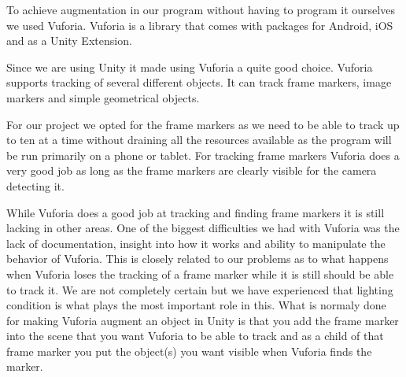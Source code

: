 To achieve augmentation in our program without having to program it ourselves we used Vuforia.
Vuforia is a library that comes with packages for Android, iOS and as a Unity Extension.

Since we are using Unity it made using Vuforia a quite good choice.
Vuforia supports tracking of several different objects. It can track frame markers, image markers and simple geometrical objects.

For our project we opted for the frame markers as we need to be able to track up to ten at a time without draining all the resources available as the program will be run primarily on a phone or tablet.
For tracking frame markers Vuforia does a very good job as long as the frame markers are clearly visible for the camera detecting it.

While Vuforia does a good job at tracking and finding frame markers it is still lacking in other areas.
One of the biggest difficulties we had with Vuforia was the lack of documentation, insight into how it works and ability to manipulate the behavior of Vuforia.
This is closely related to our problems as to what happens when Vuforia loses the tracking of a frame marker while it is still should be able to track it.
We are not completely certain but we have experienced that lighting condition is what plays the most important role in this.
What is normaly done for making Vuforia augment an object in Unity is that you add the frame marker into the scene that you want Vuforia to be able to track and as a child of that frame marker you 
put the object(s) you want visible when Vuforia finds the marker.




